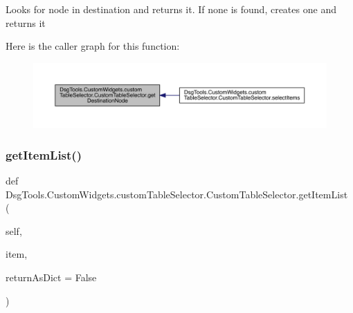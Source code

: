\begin{DoxyVerb}Looks for node in destination and returns it. If none is found, creates one and returns it
\end{DoxyVerb}
 Here is the caller graph for this function\+:
\nopagebreak
\begin{figure}[H]
\begin{center}
\leavevmode
\includegraphics[width=350pt]{class_dsg_tools_1_1_custom_widgets_1_1custom_table_selector_1_1_custom_table_selector_a5068e2812f9a69da059f578283dabfe9_icgraph}
\end{center}
\end{figure}
\mbox{\label{class_dsg_tools_1_1_custom_widgets_1_1custom_table_selector_1_1_custom_table_selector_a97292df493f03e0002c37aa4137955ae}} 
\subsubsection{\texorpdfstring{get\+Item\+List()}{getItemList()}}
{\footnotesize\ttfamily def Dsg\+Tools.\+Custom\+Widgets.\+custom\+Table\+Selector.\+Custom\+Table\+Selector.\+get\+Item\+List (\begin{DoxyParamCaption}\item[{}]{self,  }\item[{}]{item,  }\item[{}]{return\+As\+Dict = {\ttfamily False} }\end{DoxyParamCaption})}

